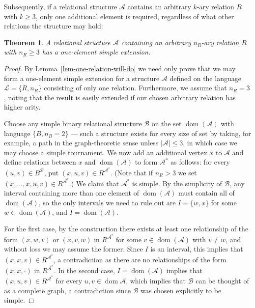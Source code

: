 \documentclass[11pt]{article}
\newtheorem{theorem}{Theorem}[section]
\begin{document}
Subsequently, if a relational structure $\mathcal{A}$ contains an arbitrary $k$-ary relation $R$ with $k\geq 3$, only one additional element is required, regardless of what other relations the structure may hold:

\begin{theorem}\label{thm-arbitrary}
A relational structure ${\mathcal{A}}$ containing an arbitrary $n_R$-ary relation $R$ with $n_R\geq 3$ has a one-element simple extension.
\end{theorem}

\begin{proof}By Lemma~\ref{lem-one-relation-will-do} we need only prove that we may form a one-element simple extension for a structure ${\mathcal{A}}$ defined on the language ${\mathcal{L}}=\{R,n_R\}$ consisting of only one relation. Furthermore, we assume that $n_R=3$, noting that the result is easily extended if our chosen arbitrary relation has higher arity.

Choose any simple binary relational structure ${\mathcal{B}}$ on the set ${\operatorname{dom}}({\mathcal{A}})$ with language $\{B, n_B=2\}$ --- such a structure exists for every size of set by taking, for example, a path in the graph-theoretic sense unless $|{\mathcal{A}}|\leq 3$, in which case we may choose a simple tournament. We now add an additional vertex $x$ to ${\mathcal{A}}$ and define relations between $x$ and ${\operatorname{dom}}({\mathcal{A}})$ to form ${\mathcal{A}}^*$ as follows: for every $(u,v)\in B^{\mathcal{B}}$, put $(x,u,v)\in R^{{\mathcal{A}}^*}$. (Note that if $n_R>3$ we set $(x,\ldots,x,u,v)\in R^{{\mathcal{A}}^*}$.) We claim that ${\mathcal{A}}^*$ is simple. By the simplicity of ${\mathcal{B}}$, any interval containing more than one element of ${\operatorname{dom}}({\mathcal{A}})$ must contain all of ${\operatorname{dom}}({\mathcal{A}})$, so the only intervals we need to rule out are $I=\{w,x\}$ for some $w\in{\operatorname{dom}}({\mathcal{A}})$, and $I={\operatorname{dom}}({\mathcal{A}})$.

For the first case, by the construction there exists at least one relationship of the form $(x,w,v)$ or $(x,v,w)$ in $R^{{\mathcal{A}}^*}$ for some $v\in{\operatorname{dom}}({\mathcal{A}})$ with $v\neq w$, and without loss we may assume the former. Since $I$ is an interval, this implies that $(x,x,v)\in R^{{\mathcal{A}}^*}$, a contradiction as there are no relationships of the form $(x,x,\cdot)$ in $R^{{\mathcal{A}}^*}$. In the second case, $I={\operatorname{dom}}({\mathcal{A}})$ implies that $(x,u,v)\in R^{{\mathcal{A}}^*}$ for every $u,v\in{\operatorname{dom}}{\mathcal{A}}$, which implies that ${\mathcal{B}}$ can be thought of as a complete graph, a contradiction since ${\mathcal{B}}$ was chosen explicitly to be simple.
\end{proof}
\end{document}
